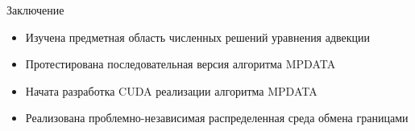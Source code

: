 \begin{frame}{Заключение}

\begin{itemize}
   \item Изучена предметная область численных решений уравнения адвекции
   \item Протестирована последовательная версия алгоритма MPDATA
   \item Начата разработка CUDA реализации алгоритма MPDATA
   \item Реализована проблемно-независимая распределенная среда обмена границами
\end{itemize}

\end{frame}
